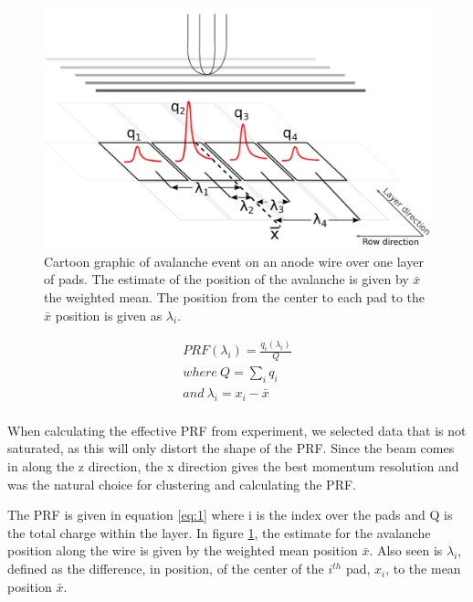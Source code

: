 \documentclass[review]{elsarticle}
\begin{document}
\begin{figure}[h]
\label{fig:av}
\includegraphics[width=\linewidth]{defofavalanche}
\caption{Cartoon graphic of avalanche event on an anode wire over one layer of pads. The estimate of the position of the avalanche is given by $\bar{x}$  the weighted mean. The position from the center to each pad to the $\bar{x}$ position is given as $\lambda_i$.}
\end{figure}

\begin{equation}\label{eq:1}
\begin{split}
PRF(\lambda_i) = \frac{q_i(\lambda_i)}{Q}\\
where \ Q=\sum_i q_i\\
and \   \lambda_i=x_i-\bar{x}\\
\end{split}
\end{equation}

When calculating the effective PRF from experiment, we selected data that is not saturated, as this will only distort the shape of the PRF. Since the beam comes in along the z direction, the x direction gives the best momentum resolution and was the natural choice for clustering and calculating the PRF. 

The PRF is given in equation \ref{eq:1} where i is the index over the pads and Q is the total charge within the layer. In figure \ref{fig:av}, the estimate for the avalanche position along the wire is given by the weighted mean position $\bar{x}$. Also seen is $\lambda_i$, defined as the difference, in position, of the center of the $i^{th}$ pad, $x_i$, to the mean position $\bar{x}$. 
\end{document}
